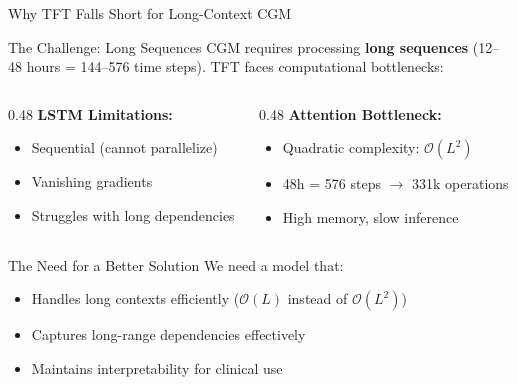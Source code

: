 \documentclass[aspectratio=169,xcolor=dvipsnames]{beamer}
\begin{document}
\begin{frame}{Why TFT Falls Short for Long-Context CGM}
    \begin{block}{The Challenge: Long Sequences}
        CGM requires processing \textbf{long sequences} (12--48 hours = 144--576 time steps). TFT faces computational bottlenecks:
        
        \vspace{0.3em}
        \begin{columns}
            \begin{column}{0.48\textwidth}
                \textbf{LSTM Limitations:}
                \begin{itemize}
                    \item Sequential (cannot parallelize)
                    \item Vanishing gradients
                    \item Struggles with long dependencies
                \end{itemize}
            \end{column}
            
            \begin{column}{0.48\textwidth}
                \textbf{Attention Bottleneck:}
                \begin{itemize}
                    \item Quadratic complexity: $\mathcal{O}(L^2)$
                    \item 48h = 576 steps $\rightarrow$ 331k operations
                    \item High memory, slow inference
                \end{itemize}
            \end{column}
        \end{columns}
    \end{block}
    
    \vspace{0.5em}
    \begin{alertblock}{The Need for a Better Solution}
        We need a model that:
        \begin{itemize}
            \item Handles long contexts efficiently ($\mathcal{O}(L)$ instead of $\mathcal{O}(L^2)$)
            \item Captures long-range dependencies effectively
            \item Maintains interpretability for clinical use
        \end{itemize}
    \end{alertblock}
\end{frame}
\end{document}
